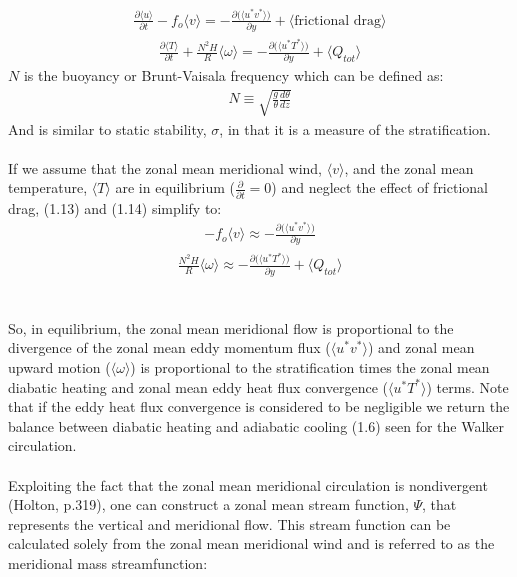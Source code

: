 \documentclass[letterpaper,12pt,titlepage,oneside,final]{book}
\begin{document}
\begin{align}
\frac{\partial{\langle{u}\rangle}}{\partial{t}} - f_{o}\langle{v}\rangle = -\frac{\partial\Big(\langle{u^{*}v^{*}}\rangle\Big)}{\partial{y}} + \langle\text{frictional drag}\rangle
\end{align}
\begin{align}
\frac{\partial{\langle{T}\rangle}}{\partial{t}} + \frac{N^{2}H}{R}\langle{\omega}\rangle = -\frac{\partial\Big(\langle{u^{*}T^{*}}\rangle\Big)}{\partial{y}} + \langle{Q_{tot}}\rangle
\end{align}
$N$ is the buoyancy or Brunt-Vaisala frequency which can be defined as: 
\begin{align}
N\equiv\sqrt{\frac{g}{\theta}\frac{d{\theta}}{dz}}
\end{align}
And is similar to static stability, $\sigma$, in that it is a measure of the stratification.
\\
\\
If we assume that the zonal mean meridional wind, $\langle{v}\rangle$, and the zonal mean temperature, $\langle{T}\rangle$ are in equilibrium ($\frac{\partial}{\partial{t}}=0$) and neglect the effect of frictional drag, (1.13) and (1.14) simplify to:
\begin{align}
-f_{o}\langle{v}\rangle \approx -\frac{\partial\Big(\langle{u^{*}v^{*}}\rangle\Big)}{\partial{y}}
\end{align}
\begin{align}
\frac{N^{2}H}{R}\langle{\omega}\rangle \approx -\frac{\partial\Big(\langle{u^{*}T^{*}}\rangle\Big)}{\partial{y}} + \langle{Q_{tot}}\rangle
\end{align}
\\
\\
So, in equilibrium, the zonal mean meridional flow is proportional to the divergence of the zonal mean eddy momentum flux ($\langle{u^{*}v^{*}}\rangle$) and zonal mean upward motion ($\langle{\omega}\rangle$) is proportional to the stratification times the zonal mean diabatic heating and zonal mean eddy heat flux convergence ($\langle{u^{*}T^{*}}\rangle$) terms. Note that if the eddy heat flux convergence is considered to be negligible we return the balance between diabatic heating and adiabatic cooling (1.6) seen for the Walker circulation. 
\\
\\
Exploiting the fact that the zonal mean meridional circulation is nondivergent (Holton, p.319), one can construct a zonal mean stream function, $\Psi$, that represents the vertical and meridional flow. This stream function can be calculated solely from the zonal mean meridional wind and is referred to as the meridional mass streamfunction:
\end{document}
